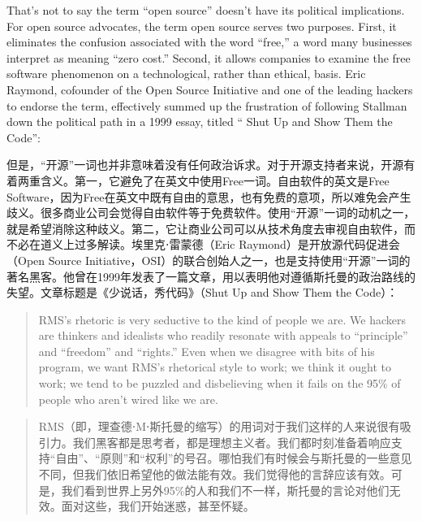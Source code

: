 \ifdefined\vone
\ifdefined\eng
That's not to say the term ``open source'' doesn't have its political implications. For open source advocates, the term open source serves two purposes. First, it eliminates the confusion associated with the word ``free,'' a word many businesses interpret as meaning ``zero cost.'' Second, it allows companies to examine the free software phenomenon on a technological, rather than ethical, basis. Eric Raymond, cofounder of the Open Source Initiative and one of the leading hackers to endorse the term, effectively summed up the frustration of following Stallman down the political path in a 1999 essay, titled `` Shut Up and Show Them the Code'':
\fi

\ifdefined\chs
但是，``开源''一词也并非意味着没有任何政治诉求。对于开源支持者来说，开源有着两重含义。第一，它避免了在英文中使用Free一词。自由软件的英文是Free Software，因为Free在英文中既有自由的意思，也有免费的意项，所以难免会产生歧义。很多商业公司会觉得自由软件等于免费软件。使用``开源''一词的动机之一，就是希望消除这种歧义。第二，它让商业公司可以从技术角度去审视自由软件，而不必在道义上过多解读。埃里克⋅雷蒙德（Eric Raymond）是开放源代码促进会（Open Source Initiative，OSI）的联合创始人之一，也是支持使用``开源''一词的著名黑客。他曾在1999年发表了一篇文章，用以表明他对遵循斯托曼的政治路线的失望。文章标题是《少说话，秀代码》（Shut Up and Show Them the Code）：
\fi
\fi

\ifdefined\eng
\begin{quote}
RMS's rhetoric is very seductive to the kind of people we are. We hackers are thinkers and idealists who readily resonate with appeals to ``principle'' and ``freedom'' and ``rights.'' Even when we disagree with bits of his program, we want RMS's rhetorical style to work; we think it ought to work; we tend to be puzzled and disbelieving when it fails on the 95\% of people who aren't wired like we are.
\end{quote}
\fi

\ifdefined\chs
\begin{quote}
RMS（即，理查德⋅M⋅斯托曼的缩写）的用词对于我们这样的人来说很有吸引力。我们黑客都是思考者，都是理想主义者。我们都时刻准备着响应支持``自由''、``原则''和``权利''的号召。哪怕我们有时候会与斯托曼的一些意见不同，但我们依旧希望他的做法能有效。我们觉得他的言辞应该有效。可是，我们看到世界上另外95\%的人和我们不一样，斯托曼的言论对他们无效。面对这些，我们开始迷惑，甚至怀疑。
\end{quote}
\fi

